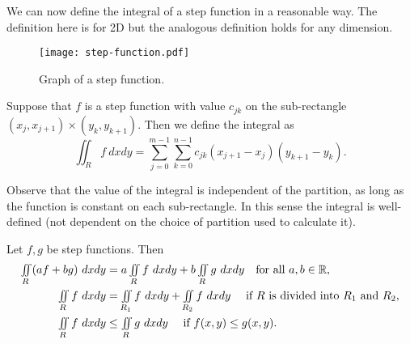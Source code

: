 We can now define the integral of a step function in a reasonable way.
The definition here is for 2D but the analogous definition holds for any dimension.
%
\begin{figure}
    \centering
    \texttt{[image: step-function.pdf]}
    \caption{Graph of a step function.}
\end{figure}
%
\begin{definition*}
    Suppose that \(f\) is a step function with value \(c_{jk}\) on the sub-rectangle \((x_{j},x_{j+1})\times (y_{k},y_{k+1})\).
    Then we define the integral as
    \[
        \iint_{R} f \ dx dy = \sum_{j=0}^{m-1} \sum_{k=0}^{n-1} c_{jk} (x_{j+1}-x_{j})(y_{k+1}-y_{k}).
    \]
\end{definition*}
%
Observe that the value of the integral is independent of the partition, as long as the function is constant on each sub-rectangle.
In this sense the integral is well-defined (not dependent on the choice of partition used to calculate it).
%
\begin{theorem}%
    \label{thm:props-integral}
    Let \(f,g\) be step functions. Then
    \[
        \begin{aligned}
            \textstyle\iint\limits_{R} (a f + b g) \ dx dy
             & = a  \textstyle\iint\limits_{R} f \ dx dy + b \textstyle\iint\limits_{R} g \ dx dy 
             \quad \text{for all \(a,b\in \mathbb{R}\)},\\
            \textstyle\iint\limits_{R} f \ dx dy
             & =  \textstyle\iint\limits_{R_1} f \ dx dy +  \textstyle\iint\limits_{R_2} f \ dx dy \quad
             \text{ if \(R\) is divided into \(R_1\) and \(R_2\)}, \\
            \textstyle\iint\limits_{R} f \ dx dy
             & \leq  \textstyle\iint\limits_{R} g \ dx dy \quad
            \text{ if \(f(x,y) \leq g(x,y)\)}.
        \end{aligned}
    \]
\end{theorem}

